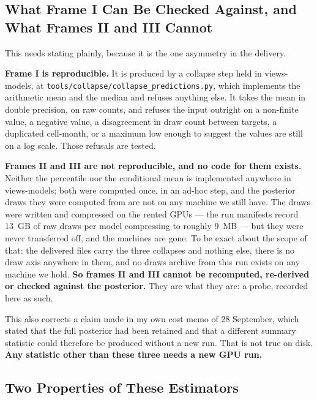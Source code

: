 \subsection*{What Frame I Can Be Checked Against, and What Frames II and III Cannot}

This needs stating plainly, because it is the one asymmetry in the delivery.

\textbf{Frame I is reproducible.} It is produced by a collapse step held in views-models, at
\texttt{tools/collapse/}\allowbreak\texttt{collapse\_predictions.py}, which implements the
arithmetic mean and the median and refuses anything else. It takes the mean in double precision, on raw
counts, and refuses the input outright on a non-finite value, a negative value, a disagreement in
draw count between targets, a duplicated cell-month, or a maximum low enough to suggest the values
are still on a log scale. Those refusals are tested.

\textbf{Frames II and III are not reproducible, and no code for them exists.} Neither the
percentile nor the conditional mean is implemented anywhere in views-models; both were computed
once, in an ad-hoc step, and the posterior draws they were computed from are not on any machine we
still have. The draws were written and compressed on the rented GPUs --- the run manifests record
13~GB of raw draws per model compressing to roughly 9~MB --- but they were never transferred off,
and the machines are gone. To be exact about the scope of that: the delivered files carry the three
collapses and nothing else, there is no draw axis anywhere in them, and no draws archive from this
run exists on any machine we hold. \textbf{So frames II and III cannot be recomputed, re-derived or
checked against the posterior.} They are what they are: a probe, recorded here as such.

This also corrects a claim made in my own cost memo of 28 September, which stated that the full
posterior had been retained and that a different summary statistic could therefore be produced
without a new run. That is not true on disk. \textbf{Any statistic other than these three needs a
new GPU run.}

\subsection*{Two Properties of These Estimators}

